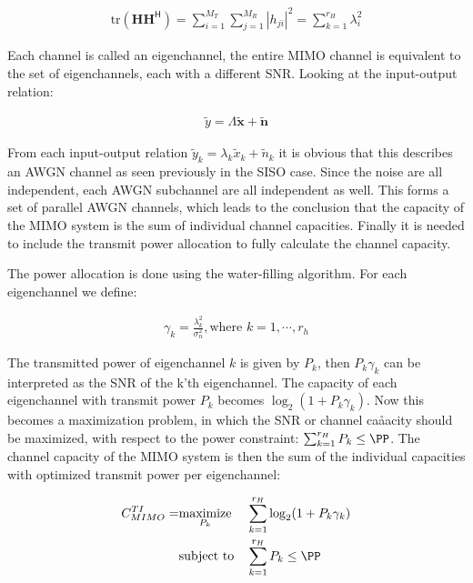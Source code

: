 \begin{align*}
  \text{tr}(\mathbf{H} \mathbf{H}^{\mathsf{H}}) = \sum_{i=1}^{M_T} \sum_{j=1}^{M_R} |h_{ji}|^2 = \sum_{k=1}^{r_H} \lambda_i^2
\end{align*}

Each channel is called an eigenchannel, the entire MIMO channel is equivalent to the set of eigenchannels, each with a different SNR. Looking at the input-output relation:

\begin{align*}
  \tilde{y} = \Lambda\mathbf{ \tilde{x}} + \mathbf{\tilde{n}}
\end{align*}

From each input-output relation $\tilde{y}_k = \lambda_k \tilde{x}_k + \tilde{n}_k$ it is obvious that this describes an AWGN channel as seen previously in the SISO case. Since the noise are all independent, each AWGN subchannel are all independent as well. This forms a set of parallel AWGN channels, which leads to the conclusion that the capacity of the MIMO system is the sum of individual channel capacities. Finally it is needed to include the transmit power allocation to fully calculate the channel capacity.


The power allocation is done using the water-filling algorithm. For each eigenchannel we define: 

\begin{align*}
  \gamma_k = \frac{\lambda_k^2}{\sigma_n^2}, \text{where } k = 1, \cdots, r_h
\end{align*}

The transmitted power of eigenchannel $k$ is given by $P_k$, then $P_k\gamma_k$ can be interpreted as the SNR of the k'th eigenchannel. The capacity of each eigenchannel with transmit power $P_k$ becomes $\log_2 (1 + P_k\gamma_k)$. Now this becomes a maximization problem, in which the SNR or channel caåacity should be maximized, with respect to the power constraint: $\sum_{k=1}^{r_H} P_k \leq \PP$. 
The channel capacity of the MIMO system is then the sum of the individual capacities with optimized transmit power per eigenchannel: 


\begin{equation*}
\begin{aligned}
C^{TI}_{MIMO} = 
& \underset{P_k}{\text{maximize}}
& & \sum_{k=1}^{r_H} \log_2 (1 + P_k\gamma_k) \\
& \text{subject to}
& & \sum_{k=1}^{r_H} P_k \leq \PP
\end{aligned}
\end{equation*}


